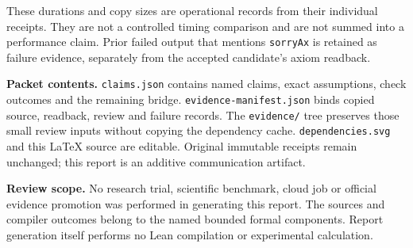 \documentclass[11pt]{article}
\begin{document}
These durations and copy sizes are operational records from their individual receipts. They are not a controlled timing comparison and are not summed into a performance claim. Prior failed output that mentions \texttt{sorryAx} is retained as failure evidence, separately from the accepted candidate's axiom readback.

\textbf{Packet contents.} \texttt{claims.json} contains named claims, exact assumptions, check outcomes and the remaining bridge. \texttt{evidence-manifest.json} binds copied source, readback, review and failure records. The \texttt{evidence/} tree preserves those small review inputs without copying the dependency cache. \texttt{dependencies.svg} and this LaTeX source are editable. Original immutable receipts remain unchanged; this report is an additive communication artifact.

\textbf{Review scope.} No research trial, scientific benchmark, cloud job or official evidence promotion was performed in generating this report. The sources and compiler outcomes belong to the named bounded formal components. Report generation itself performs no Lean compilation or experimental calculation.
\end{document}
